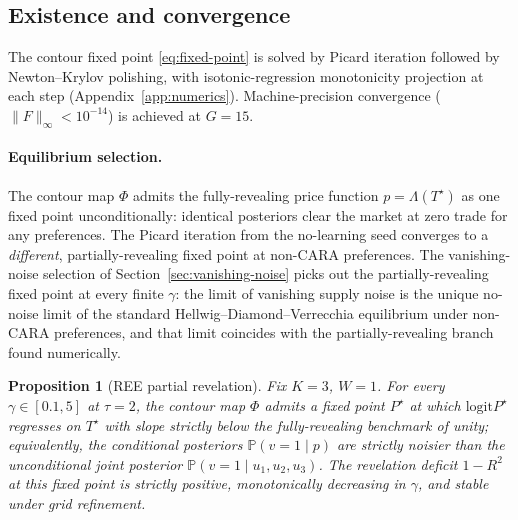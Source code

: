 \documentclass[12pt,letterpaper]{article}
\newtheorem{proposition}{Proposition}
\theoremstyle{definition}
\theoremstyle{remark}
\newcommand{\PP}{\mathbb{P}}
\newcommand{\Lam}{\Lambda}            %
\newcommand{\logit}{\mathrm{logit}}
\newcommand{\Tstar}{T^{\!\star}}
\newcommand{\1}{\mathbf{1}}
\begin{document}
\subsection{Existence and convergence}\label{sec:convergence}

The contour fixed point \eqref{eq:fixed-point} is solved by Picard
iteration followed by Newton--Krylov polishing, with isotonic-regression
monotonicity projection at each step (Appendix~\ref{app:numerics}).
Machine-precision convergence ($\|F\|_{\infty}<10^{-14}$) is achieved
at $G=15$.

\paragraph{Equilibrium selection.}
The contour map $\Phi$ admits the fully-revealing price function
$p=\Lam(\Tstar)$ as one fixed point unconditionally: identical posteriors
clear the market at zero trade for any preferences. The Picard iteration
from the no-learning seed converges to a \emph{different}, partially-revealing
fixed point at non-CARA preferences. The vanishing-noise selection of
Section~\ref{sec:vanishing-noise} picks out the partially-revealing fixed
point at every finite $\gamma$: the limit of vanishing supply noise is
the unique no-noise limit of the standard Hellwig--Diamond--Verrecchia
equilibrium under non-CARA preferences, and that limit coincides with
the partially-revealing branch found numerically.

\begin{proposition}[REE partial revelation]\label{prop:ree}
Fix $K=3$, $W=1$. For every $\gamma\in[0.1,5]$ at $\tau=2$, the contour
map $\Phi$ admits a fixed point $P^{\star}$ at which $\logit P^{\star}$
regresses on $\Tstar$ with slope strictly below the fully-revealing
benchmark of unity; equivalently, the conditional posteriors
$\PP(v=1\mid p)$ are strictly noisier than the unconditional joint
posterior $\PP(v=1\mid u_{1},u_{2},u_{3})$. The revelation deficit
$1-R^{2}$ at this fixed point is strictly positive, monotonically
decreasing in $\gamma$, and stable under grid refinement.
\end{proposition}
\end{document}
